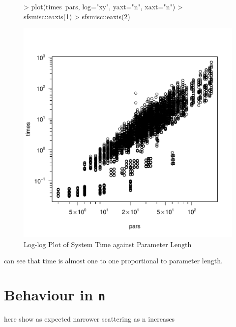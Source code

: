 \begin{figure}[h]
    \centering
\begin{Schunk}
\begin{Sinput}
>     plot(times~pars, log="xy", yaxt="n", xaxt="n")
>     sfsmisc::eaxis(1)
>     sfsmisc::eaxis(2)
\end{Sinput}
\end{Schunk}
\includegraphics{chapter3-figtime}
    \caption{Log-log Plot of System Time against Parameter Length}
    \label{fig:time}
\end{figure}

can see that time is almost one to one proportional to parameter length.

\section{Behaviour in {\tt n}}

here show as expected narrower scattering as n increases


